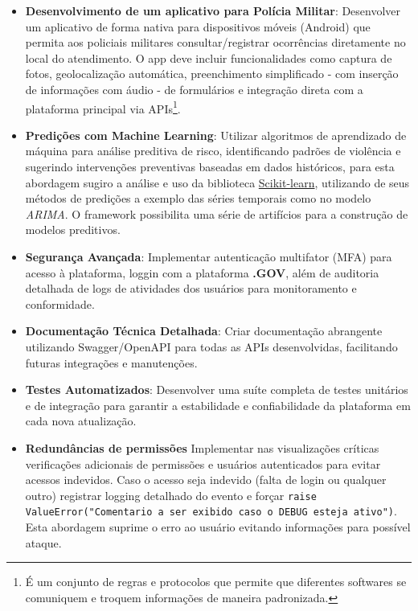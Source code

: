 \begin{itemize}
    \item \textbf{Desenvolvimento de um aplicativo para Polícia Militar}: Desenvolver um aplicativo de forma nativa para dispositivos móveis (Android) que permita aos policiais militares consultar/registrar ocorrências diretamente no local do atendimento. O app deve incluir funcionalidades como captura de fotos, geolocalização automática, preenchimento simplificado - com inserção de informações com áudio -  de formulários e integração direta com a plataforma principal via APIs\footnote{É um conjunto de regras e protocolos que permite que diferentes softwares se comuniquem e troquem informações de maneira padronizada.}.
    
        
    \item \textbf{Predições com Machine Learning}: Utilizar algoritmos de aprendizado de máquina para análise preditiva de risco, identificando padrões de violência e sugerindo intervenções preventivas baseadas em dados históricos, para esta abordagem sugiro a análise e uso da biblioteca \href{https://scikit-learn.org/stable/index.html}{Scikit-learn}, utilizando de seus métodos de predições a exemplo das séries temporais como no modelo \textit{ARIMA}. O framework possibilita uma série de artifícios para a construção de modelos preditivos.
    
    \item \textbf{Segurança Avançada}: Implementar autenticação multifator (MFA) para acesso à plataforma, loggin com a plataforma \textbf{.GOV}, além de auditoria detalhada de logs de atividades dos usuários para monitoramento e conformidade.
    
    \item \textbf{Documentação Técnica Detalhada}: Criar documentação abrangente utilizando Swagger/OpenAPI para todas as APIs desenvolvidas, facilitando futuras integrações e manutenções.
    
    \item \textbf{Testes Automatizados}: Desenvolver uma suíte completa de testes unitários e de integração para garantir a estabilidade e confiabilidade da plataforma em cada nova atualização.
    \item \textbf{Redundâncias de permissões} Implementar nas visualizações críticas verificações adicionais de permissões e usuários autenticados para evitar acessos indevidos. Caso o acesso seja indevido (falta de login ou qualquer outro) registrar logging detalhado do evento e forçar \texttt{raise ValueError("Comentario a ser exibido caso o DEBUG esteja ativo")}.
    Esta abordagem suprime o erro ao usuário evitando informações para possível ataque.
\end{itemize}

